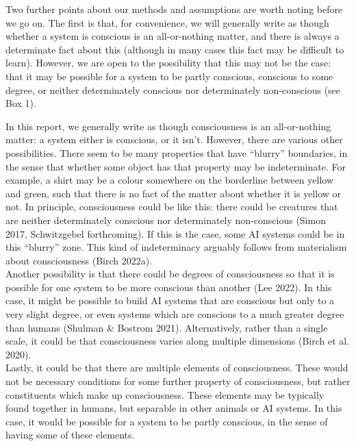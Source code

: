 \documentclass[12pt]{article}
\newcommand{\infopar}{\\[5pt]}
\begin{document}
Two further points about our methods and assumptions are worth noting before we go on. The first is that, for convenience, we will generally write as though whether a system is conscious is an all-or-nothing matter, and there is always a determinate fact about this (although in many cases this fact may be difficult to learn). However, we are open to the possibility that this may not be the case: that it may be possible for a system to be partly conscious, conscious to some degree, or neither determinately conscious nor determinately non-conscious (see Box 1). 

\begin{infobox} 
In this report, we generally write as though consciousness is an all-or-nothing matter: a system either is conscious, or it isn’t. However, there are various other possibilities. There seem to be many properties that have ``blurry'' boundaries, in the sense that whether some object has that property may be indeterminate. For example, a shirt may be a colour somewhere on the borderline between yellow and green, such that there is no fact of the matter about whether it is yellow or not. In principle, consciousness could be like this: there could be creatures that are neither determinately conscious nor determinately non-conscious (Simon 2017, Schwitzgebel forthcoming). If this is the case, some AI systems could be in this ``blurry'' zone. This kind of indeterminacy arguably follows from materialism about consciousness (Birch 2022a). 
\infopar
Another possibility is that there could be degrees of consciousness so that it is possible for one system to be more conscious than another (Lee 2022). In this case, it might be possible to build AI systems that are conscious but only to a very slight degree, or even systems which are conscious to a much greater degree than humans (Shulman \& Bostrom 2021). Alternatively, rather than a single scale, it could be that consciousness varies along multiple dimensions (Birch et al. 2020).
\infopar
Lastly, it could be that there are multiple elements of consciousness. These would not be necessary conditions for some further property of consciousness, but rather constituents which make up consciousness. These elements may be typically found together in humans, but separable in other animals or AI systems. In this case, it would be possible for a system to be partly conscious, in the sense of having some of these elements.

\end{infobox}
\end{document}
